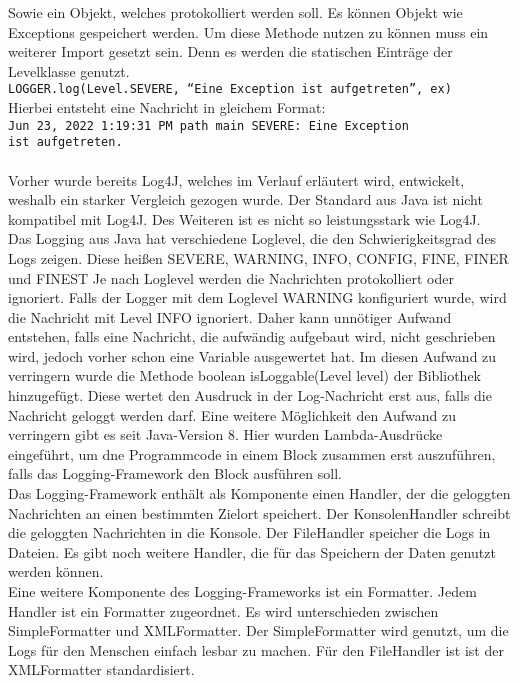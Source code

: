 {    Sowie ein Objekt, welches protokolliert werden soll.
    Es können Objekt wie Exceptions gespeichert werden.
    Um diese Methode nutzen zu können muss ein weiterer Import gesetzt sein.
    Denn es werden die statischen Einträge der Levelklasse genutzt.
    \\
    \hspace*{10mm}
    \texttt{LOGGER.log(Level.SEVERE, \enquote{Eine Exception ist aufgetreten}, ex)}
    \\
    Hierbei entsteht eine Nachricht in gleichem Format:
    \\
    \hspace*{10mm}
    \texttt{Jun 23, 2022 1:19:31 PM path main SEVERE: Eine Exception
    \\
    \hspace*{30mm} ist aufgetreten.}
    \\
    \\
    Vorher wurde bereits Log4J, welches im Verlauf erläutert wird, entwickelt, weshalb ein starker Vergleich gezogen wurde.
    Der Standard aus Java ist nicht kompatibel mit Log4J.
    Des Weiteren ist es nicht so leistungsstark wie Log4J.
    \\
    Das Logging aus Java hat verschiedene Loglevel, die den Schwierigkeitsgrad des Logs zeigen.
    Diese heißen SEVERE, WARNING, INFO, CONFIG, FINE, FINER und FINEST
    Je nach Loglevel werden die Nachrichten protokolliert oder ignoriert.
    Falls der Logger mit dem Loglevel WARNING konfiguriert wurde, wird die Nachricht mit Level INFO ignoriert.
    Daher kann unnötiger Aufwand entstehen, falls eine Nachricht, die aufwändig aufgebaut wird, nicht geschrieben wird, jedoch vorher schon eine Variable ausgewertet hat.
    Im diesen Aufwand zu verringern wurde die Methode boolean isLoggable(Level level) der Bibliothek hinzugefügt.
    Diese wertet den Ausdruck in der Log-Nachricht erst aus, falls die Nachricht geloggt werden darf.
    Eine weitere Möglichkeit den Aufwand zu verringern gibt es seit Java-Version 8.
    Hier wurden Lambda-Ausdrücke eingeführt, um dne Programmcode in einem Block zusammen erst auszuführen, falls das Logging-Framework den Block ausführen soll.
    \\
    Das Logging-Framework enthält als Komponente einen Handler, der die geloggten Nachrichten an einen bestimmten Zielort speichert.
    Der KonsolenHandler schreibt die geloggten Nachrichten in die Konsole.
    Der FileHandler speicher die Logs in Dateien.
    Es gibt noch weitere Handler, die für das Speichern der Daten genutzt werden können.
    \\
    Eine weitere Komponente des Logging-Frameworks ist ein Formatter.
    Jedem Handler ist ein Formatter zugeordnet.
    Es wird unterschieden zwischen SimpleFormatter und XMLFormatter.
    Der SimpleFormatter wird genutzt, um die Logs für den Menschen einfach lesbar zu machen.
    Für den FileHandler ist ist der XMLFormatter standardisiert.
}\autocite{rheinwerk, baeldung, examples}

